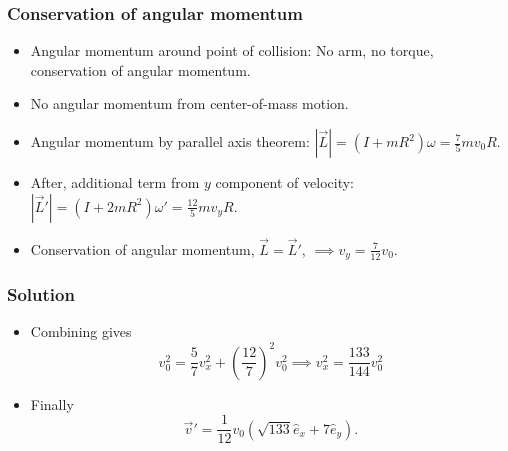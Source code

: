 \documentclass[aspectratio=169]{beamer}
\begin{document}
    \begin{frame}
        \frametitle{Conservation of angular momentum}
        \begin{itemize}
            \item Angular momentum around point of collision: No arm, no torque, conservation of angular momentum.
            \item No angular momentum from center-of-mass motion.
            \item Angular momentum by parallel axis theorem:
            $|\vec L| = (I + m R^2) \omega = \frac{7}{5} m v_0 R $.
            \item After, additional term from $y$ component of velocity: 
            $|\vec  L'| = (I + 2mR^2)\omega' = \frac{12}{5}m v_y R$.
            \item Conservation of angular momentum, $\vec L = \vec L'$,
            $
                \implies v_y = \frac{7}{12} v_0.
            $
        \end{itemize}
    \end{frame}

    \begin{frame}
        \frametitle{Solution}
        
        \begin{itemize}
            \item Combining gives
            $$
                v_0^2 = \frac{5}{7} v_x^2 + \left(\frac{12}{7}\right)^2 v_0^2
                \implies v_x^2 = \frac{133}{144} v_0^2
            $$
            \item Finally 
            $$
                \vec v' = \frac{1}{12}v_0 ( \sqrt{133} \hat e_x + 7 \hat e_y).
            $$
        \end{itemize}
    \end{frame}
\end{document}
